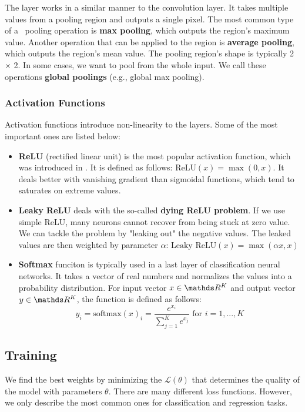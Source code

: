     The layer works in a similar manner to the convolution layer. It takes multiple
    values from a pooling region and outputs a single pixel. The most common type of
    a~ pooling operation is \textbf{max pooling}, which outputs the region's
    maximum value. Another operation that can be applied to the region is
    \textbf{average pooling}, which outputs the region's mean value. The pooling
    region's shape is typically 2 $\times$ 2. In some cases, we want to
    pool from the whole input. We call these operations \textbf{global poolings}
    (e.g., global max pooling).

    \subsubsection{Activation Functions}
    \label{afunctions}

    Activation functions introduce non-linearity to the layers. Some of the most
    important ones are listed below:
    \begin{itemize}
        \item \textbf{ReLU} (rectified linear unit) is the most popular activation
              function, which was introduced in \cite{pmlr-v15-glorot11a}. It is defined
              as follows: $\text{ReLU}(x) = \max(0, x)$. It deals better with vanishing
              gradient than sigmoidal functions, which tend to saturates on extreme values.
        \item \textbf{Leaky ReLU} deals with the so-called
              \textbf{dying ReLU problem}. If we use simple ReLU, many neurons cannot
              recover from being stuck at zero value. We can tackle the problem by
              "leaking out" the negative values. The leaked values are then weighted by
              parameter $\alpha$: $\text{Leaky ReLU}(x) = \max(\alpha x, x)$
        \item \textbf{Softmax} funciton is typically used in a last layer of
              classification neural networks. It takes a vector of real numbers and
              normalizes the values into a probability distribution. For input vector
              $x \in \real^K$ and output vector $y \in \real^K$, the function is defined
              as follows:
              $$
                  y_i = \text{softmax}(x)_i = \frac{e^{x_i}}{\sum\limits^{K}_{j = 1}
                      e^{x_j}} \text{ for } i = 1,...,K
              $$
    \end{itemize}

    \subsection{Training}
    \label{sec:training}
    We find the best weights by minimizing the  $\mathcal{L(\theta)}$
    that determines the quality of the model with parameters $\theta$. There are
    many different loss functions. However, we only describe the most common ones
    for classification and regression tasks.

